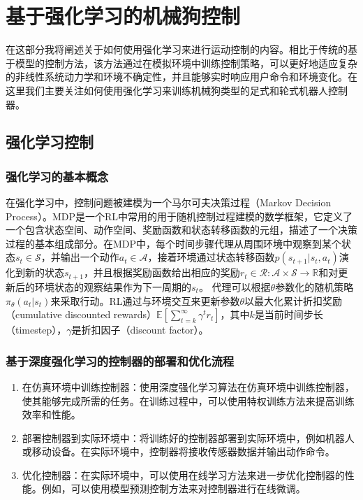 
\chapter{基于强化学习的机械狗控制}
在这部分我将阐述关于如何使用强化学习来进行运动控制的内容。相比于传统的基于模型的控制方法，该方法通过在模拟环境中训练控制策略，可以更好地适应复杂的非线性系统动力学和环境不确定性，并且能够实时响应用户命令和环境变化。在这里我们主要关注如何使用强化学习来训练机械狗类型的足式和轮式机器人控制器。

\section[强化学习控制]{强化学习控制}

\subsection[强化学习的基本概念]{强化学习的基本概念\cite{Lee_Bjelonic_Hutter_2023}}

在强化学习中，控制问题被建模为一个马尔可夫决策过程（Markov Decision Process）。MDP是一个RL中常用的用于随机控制过程建模的数学框架，它定义了一个包含状态空间、动作空间、奖励函数和状态转移函数的元组，描述了一个决策过程的基本组成部分。在MDP中，每个时间步骤代理从周围环境中观察到某个状态$s_t \in \mathcal{S}$，并输出一个动作$a_t \in \mathcal{A}$，接着环境通过状态转移函数$p(s_{t+1}|s_t, a_t)$演化到新的状态$s_{t+1}$，并且根据奖励函数给出相应的奖励$r_t\in \mathcal{R}:\mathcal{A}\times\mathcal{S}\to \mathbb{R}$和对更新后的环境状态的观察结果作为下一周期的$s_t$。
代理可以根据$\theta$参数化的随机策略$\pi_\theta(a_t|s_t)$来采取行动。RL通过与环境交互来更新参数$\theta$以最大化累计折扣奖励（cumulative discounted rewards）$\mathbb{E} [\sum_{t=k}^{\infty}\gamma^t r_t]$，其中$k$是当前时间步长（timestep），$\gamma$是折扣因子（discount factor）。

\subsection[基于深度强化学习的控制器的部署和优化流程]{基于深度强化学习的控制器的部署和优化流程}

\begin{enumerate}
    \item 在仿真环境中训练控制器：使用深度强化学习算法在仿真环境中训练控制器，使其能够完成所需的任务。在训练过程中，可以使用特权训练方法来提高训练效率和性能。
    \item 部署控制器到实际环境中：将训练好的控制器部署到实际环境中，例如机器人或移动设备。在实际环境中，控制器将接收传感器数据并输出动作命令。
    \item 优化控制器：在实际环境中，可以使用在线学习方法来进一步优化控制器的性能。例如，可以使用模型预测控制方法来对控制器进行在线微调。
\end{enumerate}

